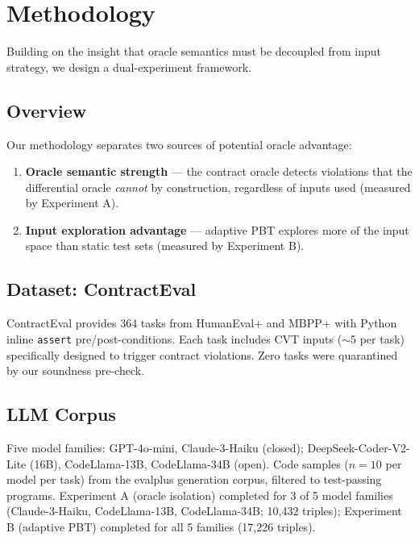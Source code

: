 \section{Methodology}
\label{sec:method}

Building on the insight that oracle semantics must be decoupled from input strategy, we design a dual-experiment framework.

\subsection{Overview}

Our methodology separates two sources of potential oracle advantage:

\begin{enumerate}
\item \textbf{Oracle semantic strength} --- the contract oracle detects violations that the differential oracle \emph{cannot} by construction, regardless of inputs used (measured by Experiment A).
\item \textbf{Input exploration advantage} --- adaptive PBT explores more of the input space than static test sets (measured by Experiment B).
\end{enumerate}

\subsection{Dataset: ContractEval}

ContractEval \citep{Lim2025ContractEval} provides 364 tasks from HumanEval+ and MBPP+ with Python inline \texttt{assert} pre/post-conditions. Each task includes CVT inputs ($\sim$5 per task) specifically designed to trigger contract violations. Zero tasks were quarantined by our soundness pre-check.

\subsection{LLM Corpus}

Five model families: GPT-4o-mini, Claude-3-Haiku (closed); DeepSeek-Coder-V2-Lite (16B), CodeLlama-13B, CodeLlama-34B (open). Code samples ($n=10$ per model per task) from the evalplus generation corpus, filtered to test-passing programs. Experiment A (oracle isolation) completed for 3 of 5 model families (Claude-3-Haiku, CodeLlama-13B, CodeLlama-34B; 10,432 triples); Experiment B (adaptive PBT) completed for all 5 families (17,226 triples).

